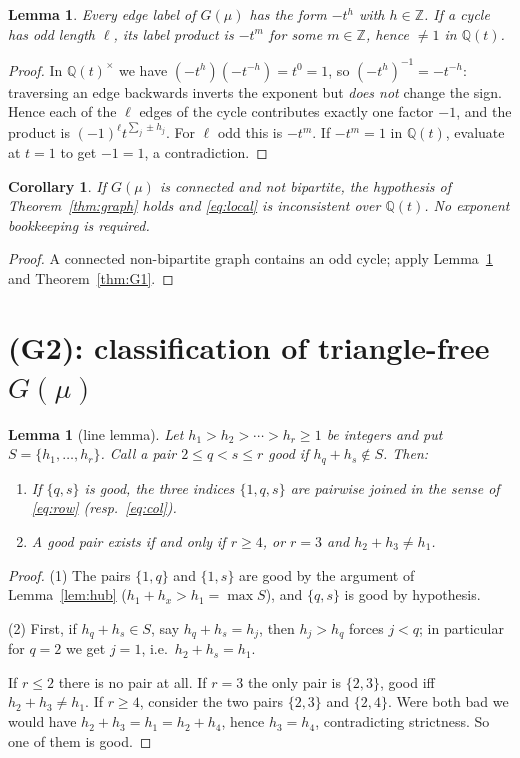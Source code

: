 \documentclass[11pt]{article}
\newtheorem{lemma}[theorem]{Lemma}
\newtheorem{corollary}[theorem]{Corollary}
\theoremstyle{definition}
\newcommand{\Q}{\mathbb{Q}}
\newcommand{\Z}{\mathbb{Z}}
\begin{document}
\begin{lemma}\label{lem:odd}
Every edge label of $G(\mu)$ has the form $-t^{h}$ with $h\in\Z$. If a cycle has odd length
$\ell$, its label product is $-t^{m}$ for some $m\in\Z$, hence $\ne1$ in $\Q(t)$.
\end{lemma}

\begin{proof}
In $\Q(t)^\times$ we have $(-t^{h})(-t^{-h})=t^{0}=1$, so $(-t^{h})^{-1}=-t^{-h}$: traversing
an edge backwards inverts the exponent but \emph{does not} change the sign. Hence each of the
$\ell$ edges of the cycle contributes exactly one factor $-1$, and the product is
$(-1)^{\ell}t^{\sum_j\pm h_j}$. For $\ell$ odd this is $-t^{m}$. If $-t^{m}=1$ in $\Q(t)$,
evaluate at $t=1$ to get $-1=1$, a contradiction.
\end{proof}

\begin{corollary}\label{cor:nonbip}
If $G(\mu)$ is connected and not bipartite, the hypothesis of Theorem~\ref{thm:graph} holds and
\eqref{eq:local} is inconsistent over $\Q(t)$. \emph{No exponent bookkeeping is required.}
\end{corollary}

\begin{proof}
A connected non-bipartite graph contains an odd cycle; apply Lemma~\ref{lem:odd} and
Theorem~\ref{thm:G1}.
\end{proof}

\section{(G2): classification of triangle-free $G(\mu)$}

\begin{lemma}[line lemma]\label{lem:line}
Let $h_1>h_2>\cdots>h_r\ge1$ be integers and put $S=\{h_1,\dots,h_r\}$. Call a pair
$2\le q<s\le r$ \emph{good} if $h_q+h_s\notin S$. Then:
\begin{enumerate}
\item If $\{q,s\}$ is good, the three indices $\{1,q,s\}$ are pairwise joined in the sense of
      \eqref{eq:row} \textup{(}resp.\ \eqref{eq:col}\textup{)}.
\item A good pair exists if and only if $r\ge4$, or $r=3$ and $h_2+h_3\ne h_1$.
\end{enumerate}
\end{lemma}

\begin{proof}
(1) The pairs $\{1,q\}$ and $\{1,s\}$ are good by the argument of Lemma~\ref{lem:hub}
($h_1+h_x>h_1=\max S$), and $\{q,s\}$ is good by hypothesis.

(2) First, if $h_q+h_s\in S$, say $h_q+h_s=h_j$, then $h_j>h_q$ forces $j<q$; in particular for
$q=2$ we get $j=1$, i.e.\ $h_2+h_s=h_1$.

If $r\le2$ there is no pair at all. If $r=3$ the only pair is $\{2,3\}$, good iff
$h_2+h_3\ne h_1$. If $r\ge4$, consider the two pairs $\{2,3\}$ and $\{2,4\}$. Were both bad we
would have $h_2+h_3=h_1=h_2+h_4$, hence $h_3=h_4$, contradicting strictness. So one of them is
good.
\end{proof}
\end{document}
